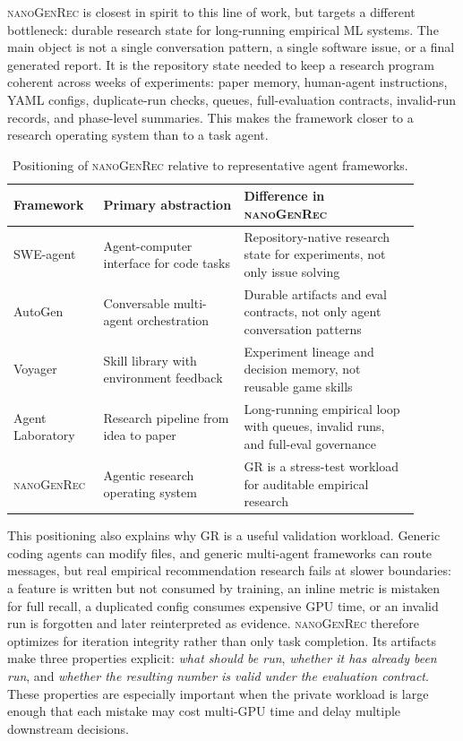 \documentclass[11pt]{article}
\begin{document}
\textsc{nanoGenRec} is closest in spirit to this line of work, but targets a different bottleneck: durable research state for long-running empirical ML systems. The main object is not a single conversation pattern, a single software issue, or a final generated report. It is the repository state needed to keep a research program coherent across weeks of experiments: paper memory, human-agent instructions, YAML configs, duplicate-run checks, queues, full-evaluation contracts, invalid-run records, and phase-level summaries. This makes the framework closer to a research operating system than to a task agent.

\begin{table}[t]
\centering
\caption{Positioning of \textsc{nanoGenRec} relative to representative agent frameworks.}
\label{tab:agentic-positioning}
\small
\begin{tabular}{p{0.18\linewidth}p{0.32\linewidth}p{0.40\linewidth}}
\toprule
Framework & Primary abstraction & Difference in \textsc{nanoGenRec} \\
\midrule
SWE-agent & Agent-computer interface for code tasks & Repository-native research state for experiments, not only issue solving \\
AutoGen & Conversable multi-agent orchestration & Durable artifacts and eval contracts, not only agent conversation patterns \\
Voyager & Skill library with environment feedback & Experiment lineage and decision memory, not reusable game skills \\
Agent Laboratory & Research pipeline from idea to paper & Long-running empirical loop with queues, invalid runs, and full-eval governance \\
\textsc{nanoGenRec} & Agentic research operating system & GR is a stress-test workload for auditable empirical research \\
\bottomrule
\end{tabular}
\end{table}

This positioning also explains why GR is a useful validation workload. Generic coding agents can modify files, and generic multi-agent frameworks can route messages, but real empirical recommendation research fails at slower boundaries: a feature is written but not consumed by training, an inline metric is mistaken for full recall, a duplicated config consumes expensive GPU time, or an invalid run is forgotten and later reinterpreted as evidence. \textsc{nanoGenRec} therefore optimizes for iteration integrity rather than only task completion. Its artifacts make three properties explicit: \emph{what should be run}, \emph{whether it has already been run}, and \emph{whether the resulting number is valid under the evaluation contract}. These properties are especially important when the private workload is large enough that each mistake may cost multi-GPU time and delay multiple downstream decisions.
\end{document}
